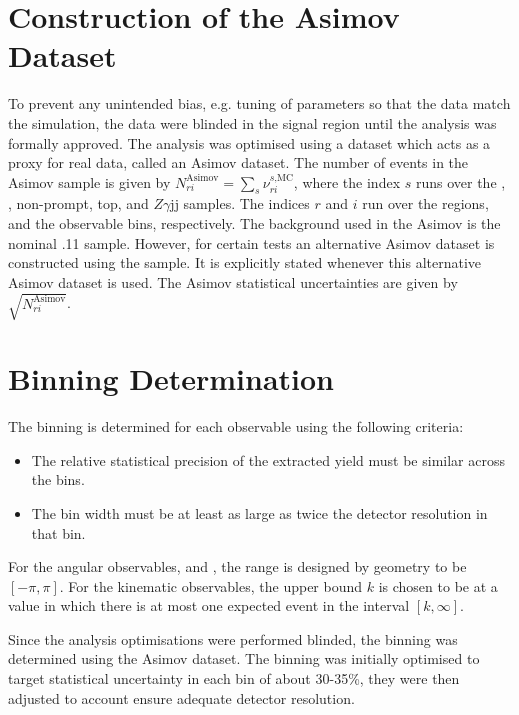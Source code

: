 \section{Construction of the Asimov Dataset}

To prevent any unintended bias, e.g. tuning of parameters so that the data match the simulation, the data were blinded in the signal region until the analysis was formally approved. The analysis was optimised using a dataset which acts as a proxy for real data, called an Asimov dataset. The number of events in the Asimov sample is given by $N^{\text{Asimov}}_{ri}=\sum_{s}\nu_{ri}^{s\text{,MC}}$, where the index $s$ runs over the \ewwy, \qcdwy, non-prompt, top, and $Z\gamma$jj samples. The indices $r$ and $i$ run over the regions, and the observable bins, respectively. The \qcdwy background used in the Asimov is the nominal .11 sample. However, for certain tests an alternative Asimov dataset is constructed using the \MADGRAPH \qcdwy sample. It is explicitly stated whenever this alternative Asimov dataset is used. The Asimov statistical uncertainties are given by $\sqrt{N^{\text{Asimov}}_{ri}}$.

\section{Binning Determination}\label{sec:vbswy:binning}

The binning is determined for each observable using the following criteria: 
\begin{itemize}
  \item The relative statistical precision of the extracted \ewwy yield must be similar across the bins.
  \item The bin width must be at least as large as twice the detector resolution in that bin.
\end{itemize}

For the angular observables, \dphisigned and \lepgamdphi, the range is designed by geometry to be $[-\pi,\pi]$. For the kinematic observables, the upper bound $k$ is chosen to be at a value in which there is at most one expected event in the interval $[k,\infty]$. 

Since the analysis optimisations were performed blinded, the binning was determined using the Asimov dataset. The binning was initially optimised to target statistical uncertainty in each bin of about 30-35\%, they were then adjusted to account ensure adequate detector resolution.

